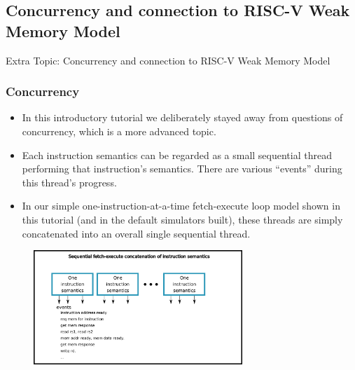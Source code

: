 \documentclass[aspectratio=169]{beamer}
\newcommand{\slidefont}{\scriptsize}
\begin{document}

\subsection{Concurrency and connection to RISC-V Weak Memory Model}


\begin{frame}[fragile]

  \slidefont

  \vfill

  \begin{center}\LARGE
    Extra Topic: Concurrency and connection to RISC-V Weak Memory Model
  \end{center}

  \vfill

\end{frame}


\begin{frame}[fragile]
  \frametitle{Concurrency}

  \slidefont

  \begin{itemize}

  \item
    In this introductory tutorial we deliberately stayed away from
    questions of concurrency, which is a more advanced topic.

  \item
    Each instruction semantics can be regarded as a small sequential
    thread performing that instruction's semantics.  There are various
    ``events'' during this thread's progress.

  \item
    In our simple one-instruction-at-a-time fetch-execute loop model
    shown in this tutorial (and in the default simulators built),
    these threads are simply concatenated into an overall single
    sequential thread.

  \end{itemize}

  \vfill

  \begin{figure}[htbp]
    \centerline{\includegraphics[height=1.7in]{Figures/Fig_sequential.png}}
  \end{figure}

\end{frame}
\end{document}
